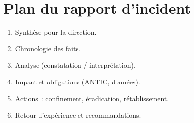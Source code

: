 \section*{Plan du rapport d'incident}
\begin{enumerate}
    \item Synthèse pour la direction.
    \item Chronologie des faits.
    \item Analyse (constatation / interprétation).
    \item Impact et obligations (ANTIC, données).
    \item Actions~: confinement, éradication, rétablissement.
    \item Retour d'expérience et recommandations.
\end{enumerate}
